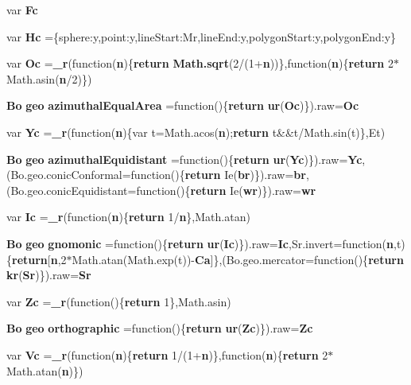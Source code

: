 \begin{DoxyCompactItemize}
\item 
var {\bf Fc}
\item 
var {\bf Hc} =\{sphere\+:y,point\+:y,line\+Start\+:\+Mr,line\+End\+:y,polygon\+Start\+:y,polygon\+End\+:y\}
\item 
var {\bf Oc} ={\bf \+\_\+r}(function({\bf n})\{{\bf return} {\bf Math.\+sqrt}(2/(1+{\bf n}))\},function({\bf n})\{{\bf return} 2$\ast$Math.\+asin({\bf n}/2)\})
\item 
{\bf Bo} {\bf geo} {\bf azimuthal\+Equal\+Area} =function()\{{\bf return} {\bf ur}({\bf Oc})\}).raw={\bf Oc}
\item 
var {\bf Yc} ={\bf \+\_\+r}(function({\bf n})\{var t=Math.\+acos({\bf n});{\bf return} t\&\&t/Math.\+sin(t)\},Et)
\item 
{\bf Bo} {\bf geo} {\bf azimuthal\+Equidistant} =function()\{{\bf return} {\bf ur}({\bf Yc})\}).raw={\bf Yc},(Bo.\+geo.\+conic\+Conformal=function()\{{\bf return} Ie({\bf br})\}).raw={\bf br},(Bo.\+geo.\+conic\+Equidistant=function()\{{\bf return} Ie({\bf wr})\}).raw={\bf wr}
\item 
var {\bf Ic} ={\bf \+\_\+r}(function({\bf n})\{{\bf return} 1/{\bf n}\},Math.\+atan)
\item 
{\bf Bo} {\bf geo} {\bf gnomonic} =function()\{{\bf return} {\bf ur}({\bf Ic})\}).raw={\bf Ic},Sr.\+invert=function({\bf n},t)\{{\bf return}[{\bf n},2$\ast$Math.\+atan(Math.\+exp(t))-\/{\bf Ca}]\},(Bo.\+geo.\+mercator=function()\{{\bf return} {\bf kr}({\bf Sr})\}).raw={\bf Sr}
\item 
var {\bf Zc} ={\bf \+\_\+r}(function()\{{\bf return} 1\},Math.\+asin)
\item 
{\bf Bo} {\bf geo} {\bf orthographic} =function()\{{\bf return} {\bf ur}({\bf Zc})\}).raw={\bf Zc}
\item 
var {\bf Vc} ={\bf \+\_\+r}(function({\bf n})\{{\bf return} 1/(1+{\bf n})\},function({\bf n})\{{\bf return} 2$\ast$Math.\+atan({\bf n})\})
\item 

\end{DoxyCompactItemize}
